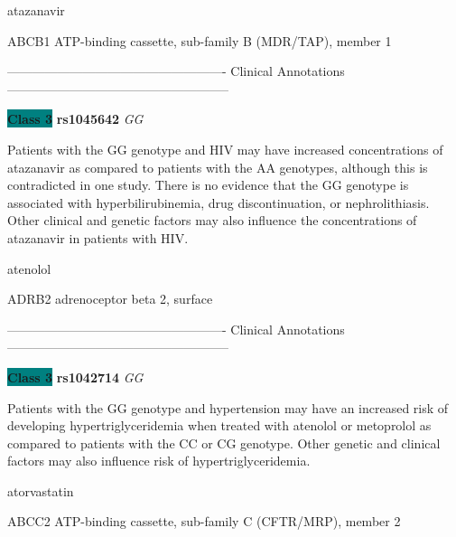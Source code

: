 \documentclass{resume} %
\begin{document}
\begin{rSection}{ atazanavir }
\begin{rSubsection}{ ABCB1 }{ ATP-binding cassette, sub-family B (MDR/TAP), member 1 }{}{}
\item[] ---------------------------------------------------- Clinical Annotations -----------------------------------------------------\newline
\item \textbf{\colorbox{teal} {Class 3}} \textbf{ rs1045642 } \textit{ GG }
\item[] Patients with the GG genotype and HIV may have increased concentrations of atazanavir as compared to patients with the AA genotypes, although this is contradicted in one study. There is no evidence that the GG genotype is associated with hyperbilirubinemia, drug discontinuation, or nephrolithiasis.  Other clinical and genetic factors may also influence the concentrations of atazanavir in patients with HIV. 
\end{rSubsection}

\end{rSection}\begin{rSection}{ atenolol }
\item[]

\begin{rSubsection}{ ADRB2 }{ adrenoceptor beta 2, surface }{}{}
\item[]

\item[] ---------------------------------------------------- Clinical Annotations -----------------------------------------------------\newline
\item \textbf{\colorbox{teal} {Class 3}} \textbf{ rs1042714 } \textit{ GG }
\item[] Patients with the GG genotype and hypertension may have an increased risk of developing hypertriglyceridemia when treated with atenolol or metoprolol as compared to patients with the CC or CG genotype. Other genetic and clinical factors may also influence risk of hypertriglyceridemia. 
\end{rSubsection}

\end{rSection}\begin{rSection}{ atorvastatin }
\item[]

\begin{rSubsection}{ ABCC2 }{ ATP-binding cassette, sub-family C (CFTR/MRP), member 2 }{}{}
\item[]


\end{rSubsection}
\end{rSection}
\end{document}
